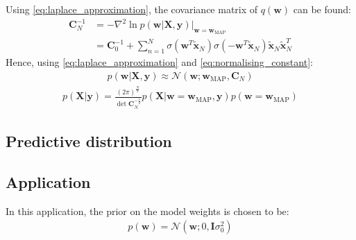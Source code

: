 \documentclass[a4paper]{article}
\begin{document}
    Using \autoref{eq:laplace_approximation}, the covariance matrix of $q(\bm{w})$ can be found:
    \begin{align}
        \bm{C}_N^{-1} &= -\nabla^2 \ln p(\bm{w} | \bm{X}, \bm{y}) \big|_{\bm{w} =\bm{w}_{\text{MAP}}} \nonumber \\
        &= \bm{C}_0^{-1}
        + \sum_{n=1}^N \sigma(\bm{w}^T \tilde{\bm{x}}_N) \sigma(-\bm{w}^T \tilde{\bm{x}}_N)\tilde{\bm{x}}_N\tilde{\bm{x}}_N^T
    \end{align}
    Hence, using \autoref{eq:laplace_approximation} and \autoref{eq:normalising_constant}:
    \begin{align}
        p(\bm{w} | \bm{X}, \bm{y}) \approx \mathcal{N}(\bm{w}; \bm{w}_\text{MAP}, \bm{C}_N)
    \end{align}
    \begin{align}
        p(\bm{X} | \bm{y}) = \frac{(2\pi)^\frac{N}{2}}{\det \bm{C}_N^{-\frac{1}{2}}}
                            p(\bm{X} | \bm{w} = \bm{w}_\text{MAP}, \bm{y}) p(\bm{w} = \bm{w}_\text{MAP})
    \end{align}

    \subsection{Predictive distribution}

    \subsection{Application}
    In this application, the prior on the model weights is chosen to be:
    \begin{align}
        p(\bm{w}) = \mathcal{N}(\bm{w}; 0, \bm{I}\sigma_0^2)
    \end{align}
\end{document}
